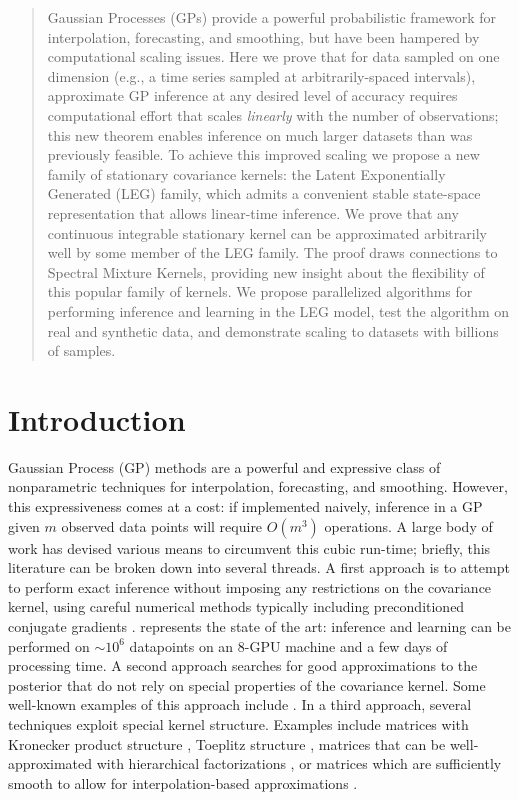 \documentclass{article}
\theoremstyle{definition}
\begin{document}
\begin{abstract}
Gaussian Processes (GPs) provide a powerful probabilistic framework for interpolation, forecasting, and smoothing, but have been hampered by computational scaling issues.  Here we prove that for data sampled on one dimension (e.g., a time series sampled at arbitrarily-spaced intervals), approximate GP inference at any desired level of accuracy requires computational effort that scales \emph{linearly} with the number of observations; this new theorem enables inference on much larger datasets than was previously feasible. To achieve this improved scaling we propose a new family of stationary covariance kernels: the Latent Exponentially Generated (LEG) family, which admits a convenient stable state-space representation that allows linear-time inference.  We prove that any continuous integrable stationary kernel can be approximated arbitrarily well by some member of the LEG family.  The proof draws connections to Spectral Mixture Kernels, providing new insight about the flexibility of this popular family of kernels.  We propose parallelized algorithms for performing inference and learning in the LEG model, test the algorithm on real and synthetic data, and demonstrate scaling to datasets with billions of samples.
\end{abstract}

\section{Introduction}

Gaussian Process (GP) methods are a powerful and expressive class of nonparametric techniques for interpolation, forecasting, and smoothing.  
However, this expressiveness comes at a cost: if implemented naively, inference in a GP given $m$ observed data points will require $O(m^3)$ operations. 
A large body of work has devised various means to circumvent this cubic run-time; briefly, this literature can be broken down into several threads.  A first approach is to attempt to perform exact inference without imposing any restrictions on the covariance kernel, using careful numerical methods typically including preconditioned conjugate gradients \cite{Cutajar2016}. \citet{Wang2019}
represents the state of the art: inference and learning can be performed on $\sim 10^6$ datapoints on an 8-GPU machine and a few days of processing time.
A second approach searches for good approximations to the posterior that do not rely on special properties of the covariance kernel.  Some well-known examples of this approach include   \cite{quinonero2005unifying,snelson2007local,hensman2013gaussian,low2015parallel,de2017gpflow}.  
In a third approach, several techniques exploit special kernel structure.  Examples include matrices with Kronecker product structure \cite{gilboa2013scaling}, Toeplitz structure \cite{zhang2005time, cunningham2008}, matrices that can be well-approximated with hierarchical factorizations \cite{Ambikasaran2015},
or matrices which are sufficiently smooth to allow for interpolation-based approximations \cite{kiss-gp}.
\end{document}
